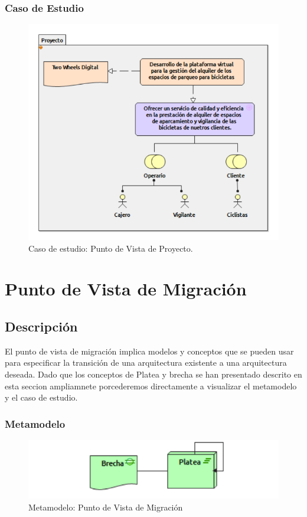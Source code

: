\subsubsection{Caso de Estudio}


\begin{figure}[H]
	\centering
	\includegraphics[width=1.0\textwidth]{imagenes/Caso_Estudio/Migracion/Proyecto.PDF}
	\caption{Caso de estudio: Punto de Vista de Proyecto.}
	\label{fig:gap_analysis}
\end{figure}

\section{Punto de Vista de Migración}
\subsection{Descripción}
El punto de vista de migración implica modelos y conceptos que se pueden usar para especificar la transición de una arquitectura existente a una arquitectura deseada. Dado que los conceptos de Platea y brecha se han presentado descrito en esta seccion ampliamnete porcederemos directamente a visualizar el metamodelo y el caso de estudio.

\subsubsection{Metamodelo}
\begin{figure}[H]
	\centering
	\includegraphics[width=1.0\textwidth]{imagenes/Metamodelos/Migracion/meta_Migracion.pdf}
	\caption{Metamodelo: Punto de Vista de Migración}
	\label{fig:gap_analysis}
\end{figure}

